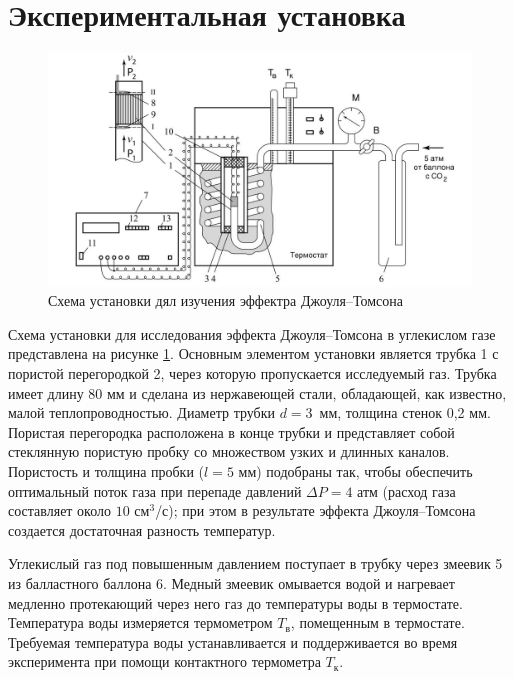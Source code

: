 \documentclass[a4paper,12pt]{article} %
\begin{document}
\section{Экспериментальная установка}

\begin{figure}[H]
	\begin{center}
		\includegraphics[width=18cm]{ustj.jpg}
	\end{center}
	\caption{Схема установки дял изучения эффектра Джоуля--Томсона}
	\label{ust}
\end{figure}

Схема установки для исследования эффекта Джоуля–Томсона в углекислом газе представлена на рисунке \ref{ust}. Основным элементом установки является трубка 1 с пористой перегородкой 2, через которую пропускается исследуемый газ. Трубка имеет длину 80 мм и сделана из нержавеющей стали, обладающей, как известно, малой теплопроводностью. Диаметр трубки $ d = 3 $~мм, толщина стенок 0,2 мм. Пористая перегородка расположена в конце трубки и представляет собой стеклянную пористую пробку со множеством узких и длинных каналов. Пористость и толщина пробки ($ l = 5 $ мм) подобраны так, чтобы обеспечить оптимальный поток газа при перепаде давлений $ \Delta P = 4 $ атм (расход газа составляет около $ 10 $ см$ ^3 $/с); при этом в результате эффекта Джоуля–Томсона создается достаточная разность температур.

Углекислый газ под повышенным давлением поступает в трубку через змеевик 5 из балластного баллона 6. Медный змеевик омывается водой и нагревает медленно протекающий через него газ до температуры воды в термостате. Температура воды измеряется термометром $ T_\text{в} $, помещенным в термостате. Требуемая температура воды устанавливается и поддерживается во время эксперимента при помощи контактного термометра $ T_\text{к} $.
\end{document}
